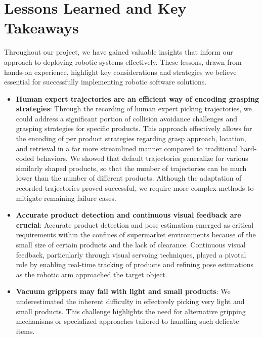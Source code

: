 \section{Lessons Learned and Key Takeaways}

Throughout our project, we have gained valuable insights that inform our approach to deploying robotic systems effectively. These lessons, drawn from hands-on experience, highlight key considerations and strategies we believe essential for successfully implementing robotic software solutions.

\begin{itemize}

    \item \textbf{Human expert trajectories are an efficient way of encoding grasping strategies}: 
    Through the recording of human expert picking
    trajectories, we could address a significant portion of
    collision avoidance challenges and grasping strategies
    for specific products. This approach effectively allows
    for the encoding of per product strategies regarding
    grasp approach, location, and retrieval in a far more
    streamlined manner compared to traditional hard-coded
    behaviors.
    We showed that default trajectories
    generalize for various similarly shaped products, so
    that the number of trajectories can be much lower than
    the number of different products.
    Although the adaptation of recorded
    trajectories proved successful, we require more complex
    methods to mitigate remaining failure cases.
    
    \item \textbf{Accurate product detection and continuous visual feedback are crucial}:
    Accurate product detection and pose estimation emerged as critical requirements within the confines of supermarket environments because of the small size of certain products and the lack of clearance. Continuous visual feedback, particularly through visual servoing techniques, played a pivotal role by enabling real-time tracking of products and refining pose estimations as the robotic arm approached the target object.

    \item \textbf{Vacuum grippers may fail with light and small products}:
    We underestimated the inherent difficulty in effectively picking very light and small products. This challenge highlights the need for alternative gripping mechanisms or specialized approaches tailored to handling such delicate items.


\end{itemize}

